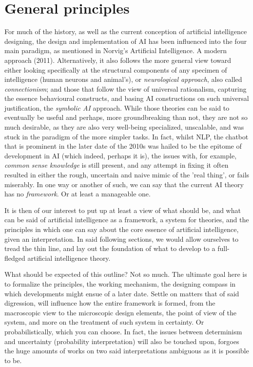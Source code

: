 \chapter{General principles}


For much of the history, as well as the current conception of artificial intelligence designing, the design and implementation of AI has been influenced into the four main paradigm, as mentioned in Norvig's Artificial Intelligence. A modern approach (2011). Alternatively, it also follows the more general view toward either looking specifically at the structural components of any specimen of intelligence (human neurons and animal's), or \textit{neurological approach}, also called \textit{connectionism}; and those that follow the view of universal rationalism, capturing the essence behavioural constructs, and basing AI constructions on such universal justification, the \textit{symbolic AI} approach. While those theories can be said to eventually be useful and perhaps, more groundbreaking than not, they are not so much desirable, as they are also very well-being specialized, unscalable, and was stuck in the paradigm of the more simpler tasks. In fact, whilst NLP, the chatbot that is prominent in the later date of the 2010s was hailed to be the epitome of development in AI (which indeed, perhaps it is), the issues with, for example, \textit{common sense knowledge} is still present, and any attempt in fixing it often resulted in either the rough, uncertain and naive mimic of the 'real thing', or fails miserably. In one way or another of such, we can say that the current AI theory has no \textit{framework}. Or at least a manageable one. 

It is then of our interest to put up at least a view of what should be, and what can be said of artificial intelligence as a framework, a system for theories, and the principles in which one can say about the core essence of artificial intelligence, given an interpretation. In said following sections, we would allow ourselves to tread the thin line, and lay out the foundation of what to develop to a full-fledged artificial intelligence theory. 

What should be expected of this outline? Not so much. The ultimate goal here is to formalize the principles, the working mechanism, the designing compass in which developments might ensue of a later date. Settle on matters that of said digression, will influence how the entire framework is formed, from the macroscopic view to the microscopic design elements, the point of view of the system, and more on the treatment of such system in certainty. Or probabilistically, which you can choose. In fact, the issues between determinism and uncertainty (probability interpretation) will also be touched upon, forgoes the huge amounts of works on two said interpretations ambiguous as it is possible to be. 

